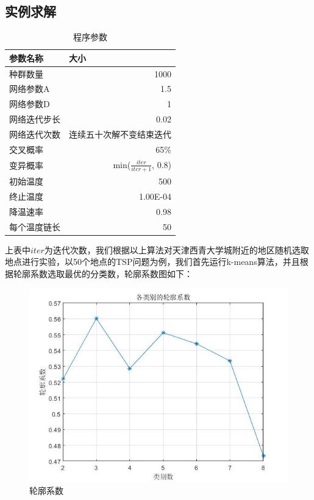 \subsection{实例求解}
\begin{table}[htbp]
    \centering
    \caption{程序参数}
      \begin{tabular}{|l|r|}
      \hline 
      参数名称  & \multicolumn{1}{l|}{大小} \\
      \hline 
      种群数量  & 1000 \\

      网络参数A & 1.5 \\

      网络参数D & 1 \\

      网络迭代步长 & 0.02 \\

      网络迭代次数 & 连续五十次解不变结束迭代 \\

      交叉概率  & 65\% \\

      变异概率  & min($\frac{iter}{iter + 1}$, 0.8) \\

      初始温度  & 500 \\

      终止温度  & 1.00E-04 \\

      降温速率  & 0.98 \\

      每个温度链长 & 50 \\
      \hline 
      \end{tabular}%
    \label{tab:cs}%
  \end{table}%
上表中$iter$为迭代次数，我们根据以上算法对天津西青大学城附近的地区随机选取地点进行实验，以50个地点的TSP问题为例，我们首先运行k-means算法，并且根据轮廓系数选取最优的分类数，轮廓系数图如下：
\begin{figure}[H]
    \centering
    \includegraphics[width=13cm]{figure/lkxs.jpg}
    \caption{轮廓系数}
    \label{fig:lkxs}
\end{figure}
